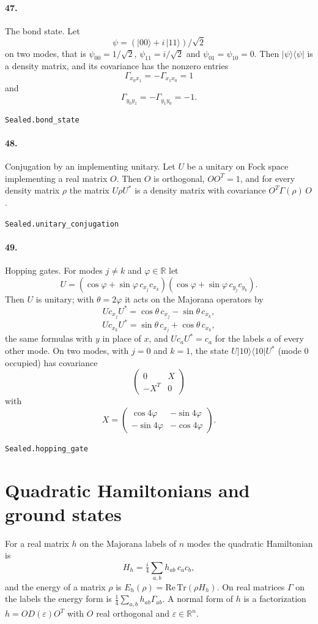 \documentclass[11pt]{article}
\begin{document}
\paragraph{47.} The bond state. Let \[\psi = (|00\rangle + i\,|11\rangle)/\sqrt 2\] on two modes, that is $\psi_{00} = 1/\sqrt 2$, $\psi_{11} = i/\sqrt 2$ and $\psi_{01} = \psi_{10} = 0$. Then $|\psi\rangle\langle\psi|$ is a density matrix, and its covariance has the nonzero entries \[\Gamma_{x_0 x_1} = -\Gamma_{x_1 x_0} = 1\] and \[\Gamma_{y_0 y_1} = -\Gamma_{y_1 y_0} = -1.\]\par{\footnotesize\texttt{Sealed.bond\_state}}

\paragraph{48.} Conjugation by an implementing unitary. Let $U$ be a unitary on Fock space implementing a real matrix $O$. Then $O$ is orthogonal, $O O^T = 1$, and for every density matrix $\rho$ the matrix $U \rho U^*$ is a density matrix with covariance $O^T \Gamma(\rho)\, O$.\par{\footnotesize\texttt{Sealed.unitary\_conjugation}}

\paragraph{49.} Hopping gates. For modes $j \ne k$ and $\varphi \in \mathbb R$ let \[U = (\cos\varphi + \sin\varphi\, c_{x_j} c_{x_k})(\cos\varphi + \sin\varphi\, c_{y_j} c_{y_k}).\] Then $U$ is unitary; with $\theta = 2\varphi$ it acts on the Majorana operators by \[U c_{x_j} U^* = \cos\theta\, c_{x_j} - \sin\theta\, c_{x_k},\] \[U c_{x_k} U^* = \sin\theta\, c_{x_j} + \cos\theta\, c_{x_k},\] the same formulas with $y$ in place of $x$, and $U c_a U^* = c_a$ for the labels $a$ of every other mode. On two modes, with $j = 0$ and $k = 1$, the state $U |10\rangle\langle 10| U^*$ (mode $0$ occupied) has covariance \[\begin{pmatrix} 0 & X \\ -X^T & 0 \end{pmatrix}\] with \[X = \begin{pmatrix} \cos 4\varphi & -\sin 4\varphi \\ -\sin 4\varphi & -\cos 4\varphi \end{pmatrix}.\]\par{\footnotesize\texttt{Sealed.hopping\_gate}}

\section*{Quadratic Hamiltonians and ground states}
For a real matrix $h$ on the Majorana labels of $n$ modes the quadratic Hamiltonian is \[H_h = \tfrac i4 \sum_{a,b} h_{ab}\, c_a c_b,\] and the energy of a matrix $\rho$ is $E_h(\rho) = \mathrm{Re}\,\mathrm{Tr}(\rho H_h)$. On real matrices $\Gamma$ on the labels the energy form is $\tfrac14 \sum_{a,b} h_{ab}\Gamma_{ab}$. A normal form of $h$ is a factorization $h = O D(\varepsilon) O^T$ with $O$ real orthogonal and $\varepsilon \in \mathbb R^n$.
\end{document}
